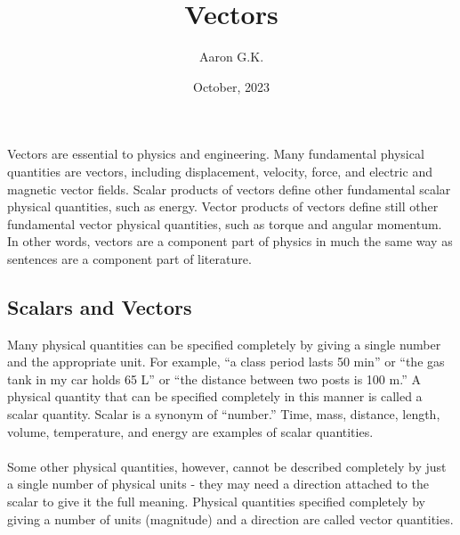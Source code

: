 \documentclass[12pt,addpoints]{exam}
\date{October, 2023}
\title{Vectors}
\author{Aaron G.K.}
\begin{document}
	\maketitle
	Vectors are essential to physics and engineering. Many fundamental physical quantities are vectors, including displacement, velocity, force, and electric and magnetic vector fields. Scalar products of vectors define other fundamental scalar physical quantities, such as energy. Vector products of vectors define still other fundamental vector physical quantities, such as torque and angular momentum. In other words, vectors are a component part of physics in much the same way as sentences are a component part of literature.
	\subsection*{Scalars and Vectors}
    Many physical quantities can be specified completely by giving a single number and the appropriate unit. For example, “a class period lasts 50 min” or “the gas tank in my car holds 65 L” or “the distance between two posts is 100 m.” A physical quantity that can be specified completely in this manner is called a scalar quantity. Scalar is a synonym of “number.” Time, mass, distance, length, volume, temperature, and energy are examples of scalar quantities.
    \\ \\
    Some other physical quantities, however, cannot be described completely by just a single number of physical units - they may need a direction attached to the scalar to give it the full meaning. Physical quantities specified completely by giving a number of units (magnitude) and a direction are called vector quantities. 
\end{document}
